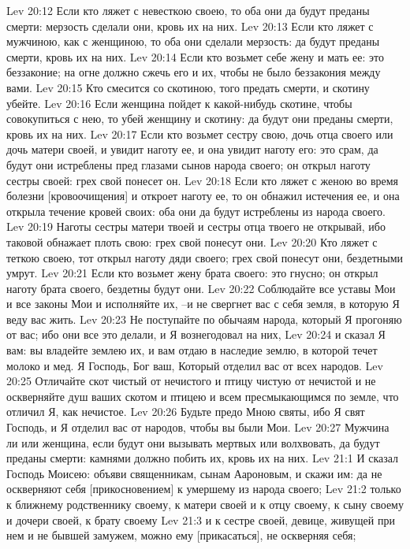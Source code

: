 Lev 20:12  Если кто ляжет с невесткою своею, то оба они да будут преданы смерти: мерзость сделали они, кровь их на них.
Lev 20:13  Если кто ляжет с мужчиною, как с женщиною, то оба они сделали мерзость: да будут преданы смерти, кровь их на них.
Lev 20:14  Если кто возьмет себе жену и мать ее: это беззаконие; на огне должно сжечь его и их, чтобы не было беззакония между вами.
Lev 20:15  Кто смесится со скотиною, того предать смерти, и скотину убейте.
Lev 20:16  Если женщина пойдет к какой-нибудь скотине, чтобы совокупиться с нею, то убей женщину и скотину: да будут они преданы смерти, кровь их на них.
Lev 20:17  Если кто возьмет сестру свою, дочь отца своего или дочь матери своей, и увидит наготу ее, и она увидит наготу его: это срам, да будут они истреблены пред глазами сынов народа своего; он открыл наготу сестры своей: грех свой понесет он.
Lev 20:18  Если кто ляжет с женою во время болезни [кровоочищения] и откроет наготу ее, то он обнажил истечения ее, и она открыла течение кровей своих: оба они да будут истреблены из народа своего.
Lev 20:19  Наготы сестры матери твоей и сестры отца твоего не открывай, ибо таковой обнажает плоть свою: грех свой понесут они.
Lev 20:20  Кто ляжет с теткою своею, тот открыл наготу дяди своего; грех свой понесут они, бездетными умрут.
Lev 20:21  Если кто возьмет жену брата своего: это гнусно; он открыл наготу брата своего, бездетны будут они.
Lev 20:22  Соблюдайте все уставы Мои и все законы Мои и исполняйте их, --и не свергнет вас с себя земля, в которую Я веду вас жить.
Lev 20:23  Не поступайте по обычаям народа, который Я прогоняю от вас; ибо они все это делали, и Я вознегодовал на них,
Lev 20:24  и сказал Я вам: вы владейте землею их, и вам отдаю в наследие землю, в которой течет молоко и мед. Я Господь, Бог ваш, Который отделил вас от всех народов.
Lev 20:25  Отличайте скот чистый от нечистого и птицу чистую от нечистой и не оскверняйте душ ваших скотом и птицею и всем пресмыкающимся по земле, что отличил Я, как нечистое.
Lev 20:26  Будьте предо Мною святы, ибо Я свят Господь, и Я отделил вас от народов, чтобы вы были Мои.
Lev 20:27  Мужчина ли или женщина, если будут они вызывать мертвых или волхвовать, да будут преданы смерти: камнями должно побить их, кровь их на них.
Lev 21:1  И сказал Господь Моисею: объяви священникам, сынам Аароновым, и скажи им: да не оскверняют себя [прикосновением] к умершему из народа своего;
Lev 21:2  только к ближнему родственнику своему, к матери своей и к отцу своему, к сыну своему и дочери своей, к брату своему
Lev 21:3  и к сестре своей, девице, живущей при нем и не бывшей замужем, можно ему [прикасаться], не оскверняя себя;
